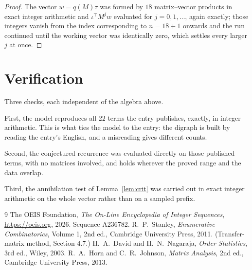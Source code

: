 \documentclass[11pt,a4paper]{article}
\theoremstyle{plain}
\theoremstyle{definition}
\begin{document}
\begin{proof}
The vector $w=q(M)\tau$ was formed by $18$ matrix--vector products in exact integer
arithmetic and $\iota^{\!\top}M^{j}w$ evaluated for $j=0,1,\dots$, again exactly; those
integers vanish from the index corresponding to $n=18+1$ onwards and the run continued
until the working vector was identically zero, which settles every larger $j$ at once.
\end{proof}

\section{Verification}

Three checks, each independent of the algebra above.

First, the model reproduces all $22$ terms the entry publishes, exactly, in integer
arithmetic. This is what ties the model to the entry: the digraph is built by reading the
entry's English, and a misreading gives different counts.

Second, the conjectured recurrence was evaluated directly on those published terms, with no
matrices involved, and holds wherever the proved range and the data overlap.

Third, the annihilation test of Lemma~\ref{lem:crit} was carried out in exact integer
arithmetic on the whole vector rather than on a sampled prefix.

\begin{thebibliography}{9}
 The OEIS Foundation, \emph{The On-Line Encyclopedia of Integer
Sequences}, \url{https://oeis.org}, 2026. Sequence A236782.
 R.~P.~Stanley, \emph{Enumerative Combinatorics}, Volume 1, 2nd ed.,
Cambridge University Press, 2011. (Transfer-matrix method, Section 4.7.)
 H.~A.~David and H.~N.~Nagaraja, \emph{Order Statistics}, 3rd ed., Wiley,
2003.
 R.~A.~Horn and C.~R.~Johnson, \emph{Matrix Analysis}, 2nd ed., Cambridge
University Press, 2013.
\end{thebibliography}
\end{document}
